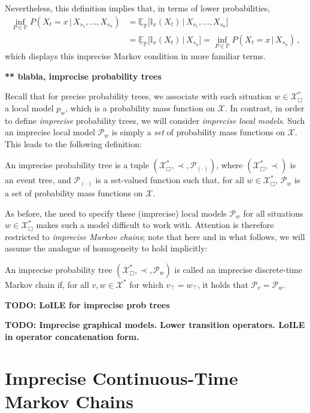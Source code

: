 \documentclass[graybox]{svmult}
\newcommand{\states}{\mathcal{X}}
\begin{document}
Nevertheless, this definition implies that, in terms of lower probabilities,
\begin{align*}
\inf_{P\in\mathbb{P}} P(X_t=x\,\vert\,X_{s_1},\ldots,X_{s_n}) &= 
\underline{\mathbb{E}}_\mathbb{P}\bigl[\mathbb{I}_{x}(X_t)\,\big\vert\, X_{s_1},\ldots,X_{s_n}\bigr] \\
 &= \underline{\mathbb{E}}_\mathbb{P}\bigl[\mathbb{I}_{x}(X_t)\,\big\vert\, X_{s_n}\bigr]
= \inf_{P\in\mathbb{P}} P(X_t=x\,\vert\,X_{s_n})\,,
\end{align*}
which displays this imprecise Markov condition in more familiar terms.

{\bf *** blabla, imprecise probability trees}

Recall that for precise probability trees, we associate with each situation $w\in\states^*_\Box$ a local model $p_w$, which is a probability mass function on $\states$. In contrast, in order to define \emph{imprecise} probability trees, we will consider \emph{imprecise local models}. Such an imprecise local model $\mathcal{P}_w$ is simply a \emph{set} of probability mass functions on $\states$. This leads to the following definition:
\begin{definition}
An imprecise probability tree is a tuple $(\states^*_\Box,\prec,\mathcal{P}_{(\cdot)})$, where $(\states^*_\Box,\prec)$ is an event tree, and $\mathcal{P}_{(\cdot)}$ is a set-valued function such that, for all $w\in\states^*_\Box$, $\mathcal{P}_w$ is a set of probability mass functions on $\states$.
\end{definition}
As before, the need to specify these (imprecise) local models $\mathcal{P}_w$ for all situations $w\in\states^*_\Box$ makes such a model difficult to work with. Attention is therefore restricted to \emph{imprecise Markov chains}; note that here and in what follows, we will assume the analogue of homogeneity to hold implicitly:
\begin{definition}An imprecise probability tree $(\states^*_\Box,\prec,\mathcal{P}_w)$ is called an imprecise discrete-time Markov chain if, for all $v,w\in\states^*$ for which $v_\top=w_\top$, it holds that $\mathcal{P}_v=\mathcal{P}_w$.
\end{definition}

{\bf TODO: LoILE for imprecise prob trees}

{\bf TODO: Imprecise graphical models. Lower transition operators. LoILE in operator concatenation form. }

\section{Imprecise Continuous-Time Markov Chains}
\end{document}
